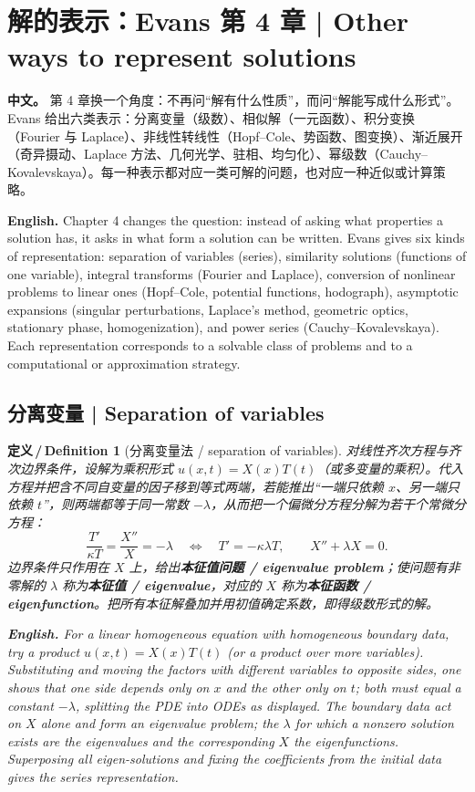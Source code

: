 \documentclass[UTF8,11pt,a4paper]{ctexart}
\newcommand{\APS}[2]{\par\noindent\textbf{中文。} #1\par\noindent\textbf{English.} #2\par\smallskip}
\newcommand{\EN}[1]{\par\noindent \textbf{English.} #1\par}
\newtheorem{definition}{定义\,/\,Definition}[section]
\begin{document}
\section{解的表示：Evans 第 4 章 | Other ways to represent solutions}
\APS{第 4 章换一个角度：不再问``解有什么性质''，而问``解能写成什么形式''。Evans 给出六类表示：分离变量（级数）、相似解（一元函数）、积分变换（Fourier 与 Laplace）、非线性转线性（Hopf--Cole、势函数、图变换）、渐近展开（奇异摄动、Laplace 方法、几何光学、驻相、均匀化）、幂级数（Cauchy--Kovalevskaya）。每一种表示都对应一类可解的问题，也对应一种近似或计算策略。}{Chapter 4 changes the question: instead of asking what properties a solution has, it asks in what form a solution can be written. Evans gives six kinds of representation: separation of variables (series), similarity solutions (functions of one variable), integral transforms (Fourier and Laplace), conversion of nonlinear problems to linear ones (Hopf--Cole, potential functions, hodograph), asymptotic expansions (singular perturbations, Laplace's method, geometric optics, stationary phase, homogenization), and power series (Cauchy--Kovalevskaya). Each representation corresponds to a solvable class of problems and to a computational or approximation strategy.}

\subsection{分离变量 | Separation of variables}
\begin{definition}[分离变量法 / separation of variables]\label{def:sep}
对线性齐次方程与齐次边界条件，设解为乘积形式 $u(x,t)=X(x)T(t)$（或多变量的乘积）。代入方程并把含不同自变量的因子移到等式两端，若能推出``一端只依赖 $x$、另一端只依赖 $t$''，则两端都等于同一常数 $-\lambda$，从而把一个偏微分方程分解为若干个常微分方程：
\[
\frac{T'}{\kappa T}=\frac{X''}{X}=-\lambda\quad\Longleftrightarrow\quad
T'=-\kappa\lambda T,\qquad X''+\lambda X=0 .
\]
边界条件只作用在 $X$ 上，给出\textbf{本征值问题 / eigenvalue problem}；使问题有非零解的 $\lambda$ 称为\textbf{本征值 / eigenvalue}，对应的 $X$ 称为\textbf{本征函数 / eigenfunction}。把所有本征解叠加并用初值确定系数，即得级数形式的解。
\EN{For a linear homogeneous equation with homogeneous boundary data, try a product $u(x,t)=X(x)T(t)$ (or a product over more variables). Substituting and moving the factors with different variables to opposite sides, one shows that one side depends only on $x$ and the other only on $t$; both must equal a constant $-\lambda$, splitting the PDE into ODEs as displayed. The boundary data act on $X$ alone and form an eigenvalue problem; the $\lambda$ for which a nonzero solution exists are the eigenvalues and the corresponding $X$ the eigenfunctions. Superposing all eigen-solutions and fixing the coefficients from the initial data gives the series representation.}
\end{definition}
\end{document}

